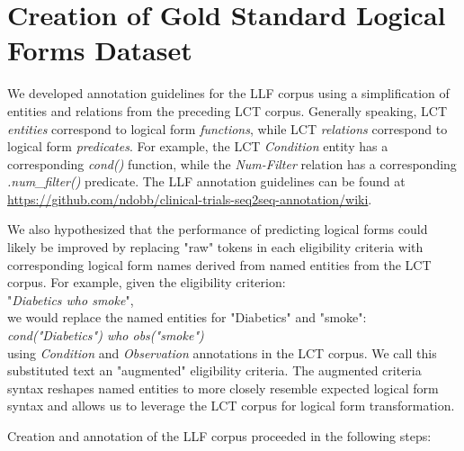 \documentclass[../main.tex]{subfiles}
\begin{document}
\section{Creation of Gold Standard Logical Forms Dataset}

We developed annotation guidelines for the LLF corpus using a simplification of entities and relations from the preceding LCT corpus\cite{dobbins2022leaf}. Generally speaking, LCT \textit{entities} correspond to logical form \textit{functions}, while LCT \textit{relations} correspond to logical form \textit{predicates}. For example, the LCT \textit{Condition} entity has a corresponding \textit{cond()} function, while the \textit{Num-Filter} relation has a corresponding \textit{.num\_filter()} predicate. The LLF annotation guidelines can be found at \url{https://github.com/ndobb/clinical-trials-seq2seq-annotation/wiki}.

We also hypothesized that the performance of predicting logical forms could likely be improved by replacing "raw" tokens in each eligibility criteria with corresponding logical form names derived from named entities from the LCT corpus. For example, given the eligibility criterion: \\

"\textit{Diabetics who smoke}", \\

\noindent we would replace the named entities for "Diabetics" and "smoke": \\ 

\textit{cond("Diabetics") who obs("smoke")} \\

\noindent using \textit{Condition} and \textit{Observation} annotations in the LCT corpus. We call this substituted text an "augmented" eligibility criteria. The augmented criteria syntax reshapes named entities to more closely resemble expected logical form syntax and allows us to leverage the LCT corpus for logical form transformation.

Creation and annotation of the LLF corpus proceeded in the following steps:
\end{document}
